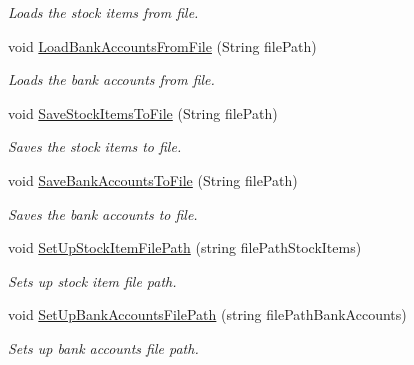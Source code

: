 \begin{DoxyCompactItemize}
\begin{DoxyCompactList}\small\item\em Loads the stock items from file. \item\end{DoxyCompactList}\item 
void \hyperlink{class_application_logic_1_1_presenter_1_1_congregate_presenter_abd887c47c94ba9ee09752599366ae894}{LoadBankAccountsFromFile} (String filePath)
\begin{DoxyCompactList}\small\item\em Loads the bank accounts from file. \item\end{DoxyCompactList}\item 
void \hyperlink{class_application_logic_1_1_presenter_1_1_congregate_presenter_a17a85c2e2036d7c6f44f1ed6854327a8}{SaveStockItemsToFile} (String filePath)
\begin{DoxyCompactList}\small\item\em Saves the stock items to file. \item\end{DoxyCompactList}\item 
void \hyperlink{class_application_logic_1_1_presenter_1_1_congregate_presenter_a68bc08bf2c366a84f92c9e40104aeb57}{SaveBankAccountsToFile} (String filePath)
\begin{DoxyCompactList}\small\item\em Saves the bank accounts to file. \item\end{DoxyCompactList}\item 
void \hyperlink{class_application_logic_1_1_presenter_1_1_congregate_presenter_a45ef7a71499993d5781c88cce6528c5b}{SetUpStockItemFilePath} (string filePathStockItems)
\begin{DoxyCompactList}\small\item\em Sets up stock item file path. \item\end{DoxyCompactList}\item 
void \hyperlink{class_application_logic_1_1_presenter_1_1_congregate_presenter_a805286b73eb8dec4b5f2f95a26fe4aa0}{SetUpBankAccountsFilePath} (string filePathBankAccounts)
\begin{DoxyCompactList}\small\item\em Sets up bank accounts file path. \item\end{DoxyCompactList}\item 

\end{DoxyCompactItemize}
